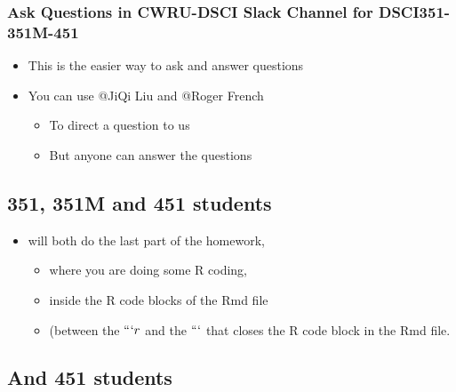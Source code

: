 \documentclass[]{article}
\providecommand{\tightlist}{%
  \setlength{\itemsep}{0pt}\setlength{\parskip}{0pt}}
\begin{document}
\hypertarget{ask-questions-in-cwru-dsci-slack-channel-for-dsci351-351m-451}{%
\subsubsection{Ask Questions in CWRU-DSCI Slack Channel for
DSCI351-351M-451}\label{ask-questions-in-cwru-dsci-slack-channel-for-dsci351-351m-451}}

\begin{itemize}
\tightlist
\item
  This is the easier way to ask and answer questions
\item
  You can use @JiQi Liu and @Roger French

  \begin{itemize}
  \tightlist
  \item
    To direct a question to us
  \item
    But anyone can answer the questions
  \end{itemize}
\end{itemize}

\hypertarget{m-and-451-students}{%
\subsection{351, 351M and 451 students}\label{m-and-451-students}}

\begin{itemize}
\tightlist
\item
  will both do the last part of the homework,

  \begin{itemize}
  \tightlist
  \item
    where you are doing some R coding,
  \item
    inside the R code blocks of the Rmd file
  \item
    (between the \(```{r}\) and the \(```\) that closes the R code block
    in the Rmd file.
  \end{itemize}
\end{itemize}

\hypertarget{and-451-students}{%
\subsection{And 451 students}\label{and-451-students}}
\end{document}
